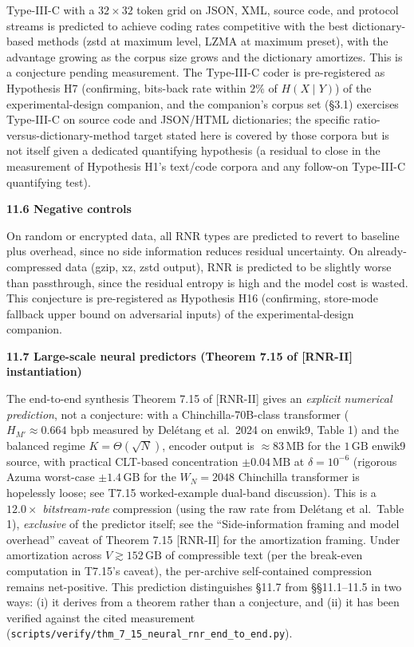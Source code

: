 \documentclass[
]{article}
\begin{document}
Type-III-C with a $32 \times 32$ token grid on JSON, XML, source
code, and protocol streams is predicted to achieve coding rates
competitive with the best dictionary-based methods (zstd at maximum
level, LZMA at maximum preset), with the advantage growing as the
corpus size grows and the dictionary amortizes. This is a conjecture
pending measurement. The Type-III-C coder is pre-registered as
Hypothesis H7 (confirming, bits-back rate within $2\%$ of $H(X\mid Y)$)
of the experimental-design companion, and the companion's corpus set
(\S3.1) exercises Type-III-C on source code and JSON/HTML dictionaries;
the specific ratio-versus-dictionary-method target stated here is
covered by those corpora but is not itself given a dedicated quantifying
hypothesis (a residual to close in the measurement of Hypothesis H1's
text/code corpora and any follow-on Type-III-C quantifying test).

\textbf{11.6 Negative controls}

On random or encrypted data, all RNR types are predicted to revert to
baseline plus overhead, since no side information reduces residual
uncertainty. On already-compressed data (gzip, xz, zstd output), RNR
is predicted to be slightly worse than passthrough, since the
residual entropy is high and the model cost is wasted. This conjecture
is pre-registered as Hypothesis H16 (confirming, store-mode fallback
upper bound on adversarial inputs) of the experimental-design companion.

\textbf{11.7 Large-scale neural predictors (Theorem 7.15 of [RNR-II] instantiation)}

The end-to-end synthesis Theorem 7.15 of [RNR-II] gives an \emph{explicit
numerical prediction}, not a conjecture: with a Chinchilla-70B-class
transformer ($H_{M'} \approx 0.664$ bpb measured by Delétang et al.\
2024 on enwik9, Table 1) and the balanced regime $K = \Theta(\sqrt{N})$,
encoder output is $\approx 83\,\mathrm{MB}$ for the $1\,\mathrm{GB}$
enwik9 source, with practical CLT-based concentration $\pm 0.04\,\mathrm{MB}$
at $\delta = 10^{-6}$ (rigorous Azuma worst-case
$\pm 1.4\,\mathrm{GB}$ for the $W_N = 2048$ Chinchilla transformer
is hopelessly loose; see T7.15 worked-example dual-band discussion).
This is a $12.0\times$ \emph{bitstream-rate}
compression (using the raw rate from Delétang et al.\ Table 1), \emph{exclusive} of
the predictor itself; see the ``Side-information framing and model
overhead'' caveat of Theorem 7.15 [RNR-II] for the amortization framing. Under
amortization across $V \gtrsim 152\,\mathrm{GB}$ of compressible text
(per the break-even computation in T7.15's caveat), the per-archive
self-contained compression remains net-positive. This prediction
distinguishes §11.7 from §§11.1--11.5 in two ways: (i) it derives
from a theorem rather than a conjecture, and (ii) it has been
verified against the cited measurement
(\texttt{scripts/verify/thm\_7\_15\_neural\_rnr\_end\_to\_end.py}).
\end{document}

